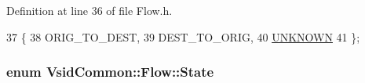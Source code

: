 Definition at line 36 of file Flow.\-h.


\begin{DoxyCode}
37     \{
38         ORIG\_TO\_DEST,
39         DEST\_TO\_ORIG,
40         \hyperlink{namespace_vsid_training_a3bd76b3dc03035a8bde253556505b46aae9b392da625bf1bf9f2d738a4bc6bdb0}{UNKNOWN}
41     \};
\end{DoxyCode}
\hypertarget{class_vsid_common_1_1_flow_a4c78d7517903031a861c7287e706a6c2}{
\subsubsection[{State}]{\setlength{\rightskip}{0pt plus 5cm}enum {\bf Vsid\-Common\-::\-Flow\-::\-State}\hspace{0.3cm}{\ttfamily [strong]}}}\label{class_vsid_common_1_1_flow_a4c78d7517903031a861c7287e706a6c2}
